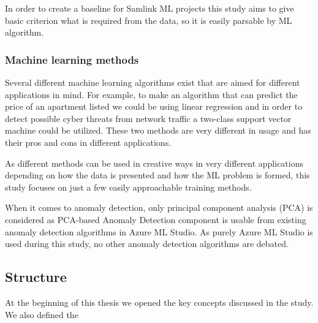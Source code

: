 In order to create a baseline for Samlink ML projects
this study aims to give basic criterion
what is required from the data,
so it is easily parsable by ML algorithm.


\subsubsection*{Machine learning methods}
Several different machine learning algorithms exist
that are aimed for different applications in mind.
For example,
to make an algorithm that can predict
the price of an apartment listed\cite{winky}
we could be using linear regression
and in order to detect
possible cyber threats from network traffic\cite{ghanem}
a two-class support vector machine could be utilized.
These two methods are very different in usage
and has their pros and cons in different applications.

As different methods can be used in creative ways
in very different applications
depending on how the data is presented
and how the ML problem is formed,
this study focuses on
just a few easily approachable training methods.

When it comes to anomaly detection,
only principal component analysis (PCA)
is considered as
PCA-based Anomaly Detection component is usable
from existing anomaly detection algorithms
in Azure ML Studio.
As purely Azure ML Studio is used during this study,
no other anomaly detection algorithms are debated.

\subsection{Structure}\label{subsec:intro-structure}
At the beginning of this thesis
we opened the key concepts discussed in the study.
We also defined the


\clearpage
